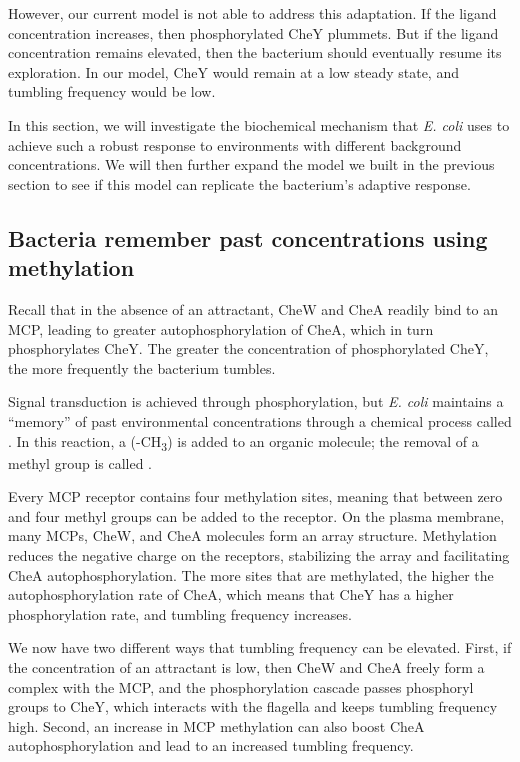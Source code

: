 However, our current model is not able to address this adaptation. If the ligand concentration increases, then phosphorylated CheY plummets. But if the ligand concentration remains elevated, then the bacterium should eventually resume its exploration. In our model, CheY would remain at a low steady state, and tumbling frequency would be low.

In this section, we will investigate the biochemical mechanism that \textit{E. coli} uses to achieve such a robust response to environments with different background concentrations. We will then further expand the model we built in the previous section to see if this model can replicate the bacterium's adaptive response.

\FloatBarrier
{}
\subsection{Bacteria remember past concentrations using methylation}

Recall that in the absence of an attractant, CheW and CheA readily bind to an MCP, leading to greater autophosphorylation of CheA, which in turn phosphorylates CheY. The greater the concentration of phosphorylated CheY, the more frequently the bacterium tumbles.

Signal transduction is achieved through phosphorylation, but \textit{E. coli} maintains a ``memory'' of past environmental concentrations through a chemical process called . In this  reaction, a  (-CH\textsubscript{3}) is added to an organic molecule; the removal of a methyl group is called .

Every MCP receptor contains four methylation sites, meaning that between zero and four methyl groups can be added to the receptor. On the plasma membrane, many MCPs, CheW, and CheA molecules form an array structure. Methylation reduces the negative charge on the receptors, stabilizing the array and facilitating CheA autophosphorylation. The more sites that are methylated, the higher the autophosphorylation rate of CheA, which means that CheY has a higher phosphorylation rate, and tumbling frequency increases.

We now have two different ways that tumbling frequency can be elevated. First, if the concentration of an attractant is low, then CheW and CheA freely form a complex with the MCP, and the phosphorylation cascade passes phosphoryl groups to CheY, which interacts with the flagella and keeps tumbling frequency high. Second, an increase in MCP methylation can also boost CheA autophosphorylation and lead to an increased tumbling frequency.

